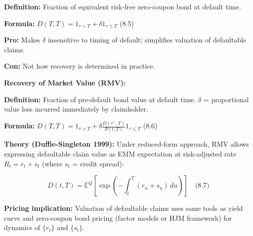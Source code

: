 \documentclass[12pt,a4paper]{article}
\begin{document}
\textbf{Definition:} Fraction of equivalent risk-free zero-coupon bond at default time.

\textbf{Formula:} $D(T,T) = 1_{\tau>T} + \delta 1_{\tau \leq T}$ \quad (8.5)

\textbf{Pro:} Makes $\delta$ insensitive to timing of default; simplifies valuation of defaultable claims.

\textbf{Con:} Not how recovery is determined in practice.

\vspace{0.3em}
\noindent\textbf{Recovery of Market Value (RMV):}

\textbf{Definition:} Fraction of pre-default bond value at default time. $\delta$ = proportional value loss incurred immediately by claimholder.

\textbf{Formula:} $D(T,T) = 1_{\tau>T} + \delta \frac{D(\tau^-, T)}{P(t,T)} 1_{\tau \leq T}$ \quad (8.6)

\textbf{Theory (Duffie-Singleton 1999):} Under reduced-form approach, RMV allows expressing defaultable claim value as EMM expectation at risk-adjusted rate $R_t = r_t + s_t$ (where $s_t$ = credit spread):

$$D(t,T) = \mathbb{E}^Q\left[\exp\left(-\int_t^T (r_u + s_u)\,du\right)\right] \quad \text{(8.7)}$$

\textbf{Pricing implication:} Valuation of defaultable claims uses same tools as yield curve and zero-coupon bond pricing (factor models or HJM framework) for dynamics of $\{r_t\}$ and $\{s_t\}$.
\end{document}
